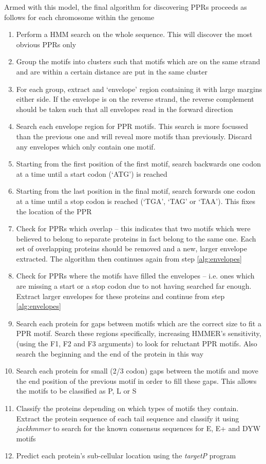 Armed with this model, the final algorithm for discovering PPRs proceeds as
follows for each chromosome within the genome
\begin{enumerate}
  \item Perform a HMM search on the whole sequence. This will discover the most
    obvious PPRs only
  \item Group the motifs into clusters such that motifs which are on the same
    strand and are within a certain distance are put in the same cluster
  \item For each group, extract and `envelope' region containing it with large
    margins either side. If the envelope is on the reverse strand, the reverse
    complement should be taken such that all envelopes read in the forward
    direction
  \item \label{alg:envelopes}
    Search each envelope region for PPR motifs. This search is more
    focussed than the previous one and will reveal more motifs than previously.
    Discard any envelopes which only contain one motif.
  \item Starting from the first position of the first motif, search backwards
    one codon at a time until a start codon (`ATG') is reached
  \item Starting from the last position in the final motif, search forwards one
    codon at a time until a stop codon is reached (`TGA', `TAG' or `TAA'). This
    fixes the location of the PPR
  \item Check for PPRs which overlap -- this indicates that two motifs which
    were believed to belong to separate proteins in fact belong to the same
    one. Each set of overlapping proteins should be removed and a new, larger
    envelope extracted. The algorithm then continues again from step
    \ref{alg:envelopes}
  \item Check for PPRs where the motifs have filled the envelopes -- i.e. ones
    which are missing a start or a stop codon due to not having searched far
    enough. Extract larger envelopes for these proteins and continue from step
    \ref{alg:envelopes}
  \item Search each protein for gaps between motifs which are the correct size
    to fit a PPR motif. Search these regions specifically, increasing HMMER's
    sensitivity, (using the F1, F2 and F3 arguments) to look for reluctant PPR
    motifs. Also search the beginning and the end of the protein in this way
  \item Search each protein for small (2/3 codon) gaps between the motifs and
    move the end position of the previous motif in order to fill these gaps.
    This allows the motifs to be classified as P, L or S
  \item Classify the proteins depending on which types of motifs they contain.
    Extract the protein sequence of each tail sequence and classify it using
    \emph{jackhmmer} to search for the known consensus sequences for E, E+ and
    DYW motifs
  \item Predict each protein's sub-cellular location using the \emph{targetP}
    program
\end{enumerate}



